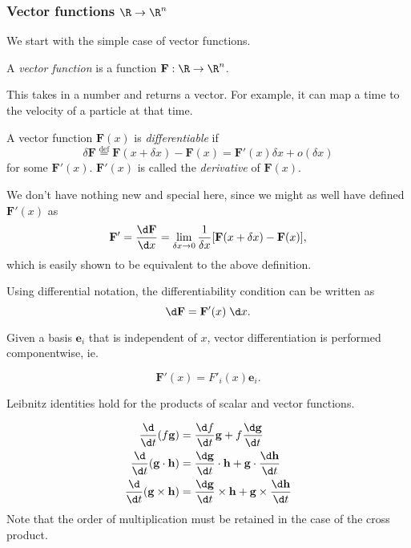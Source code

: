 \documentclass[a4paper]{article}
\begin{document}
\subsubsection*{Vector functions \texorpdfstring{$\R \to \R^n$}{R to Rn}}
We start with the simple case of vector functions.
\begin{defi}
  A \emph{vector function} is a function $\mathbf{F}: \R\to \R^n$.
\end{defi}
This takes in a number and returns a vector. For example, it can map a time to the velocity of a particle at that time.

\begin{defi}
  A vector function $\mathbf{F}(x)$ is \emph{differentiable} if
  \[
    \delta \mathbf{F} \stackrel{\text{def}}{=}\mathbf{F}(x + \delta x)- \mathbf{F}(x) = \mathbf{F}'(x)\delta x + o(\delta x)
  \]
  for some $\mathbf{F}'(x)$. $\mathbf{F}'(x)$ is called the \emph{derivative} of $\mathbf{F}(x)$.
\end{defi}
We don't have nothing new and special here, since we might as well have defined $\mathbf{F}'(x)$ as
\[
  \mathbf{F}' = \frac{\d \mathbf{F}}{\d x} = \lim_{\delta x \to 0} \frac{1}{\delta x}[\mathbf{F}(x + \delta x) - \mathbf{F}(x)],
\]
which is easily shown to be equivalent to the above definition.

Using differential notation, the differentiability condition can be written as
\[
  \d\mathbf{F} = \mathbf{F}'(x)\;\d x.
\]

Given a basis $\mathbf{e}_i$ that is independent of $x$, vector differentiation is performed componentwise, ie.
\begin{prop}
  \[
    \mathbf{F}'(x) = F'_i(x)\mathbf{e}_i.
  \]
\end{prop}
Leibnitz identities hold for the products of scalar and vector functions.
\begin{prop}
  \begin{align*}
    \frac{\d}{\d t}(f\mathbf{g}) &= \frac{\d f}{\d t}\mathbf{g} + f\frac{\d \mathbf{g}}{\d t}\\
    \frac{\d}{\d t}(\mathbf{g}\cdot \mathbf{h}) &= \frac{\d \mathbf{g}}{\d t}\cdot \mathbf{h} + \mathbf{g}\cdot \frac{\d \mathbf{h}}{\d t}\\
    \frac{\d}{\d t}(\mathbf{g}\times \mathbf{h}) &= \frac{\d \mathbf{g}}{\d t}\times \mathbf{h} + \mathbf{g}\times \frac{\d \mathbf{h}}{\d t}
  \end{align*}
  Note that the order of multiplication must be retained in the case of the cross product.
\end{prop}
\end{document}
